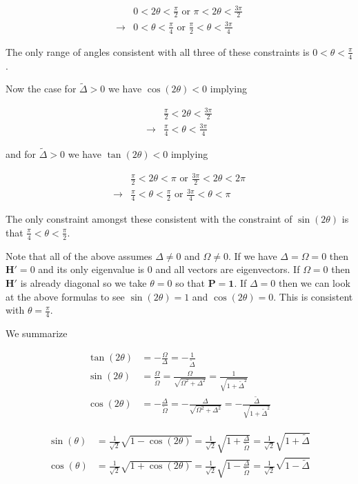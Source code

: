 \documentclass[12pt]{article}
\newcommand{\bv}[1]{\boldsymbol{#1}}
\begin{document}
\begin{align}
&0<2\theta <\frac{\pi}{2} \text{ or } \pi<2\theta<\frac{3\pi}{2}\\
\rightarrow &0<\theta<\frac{\pi}{4} \text{ or } \frac{\pi}{2}<\theta<\frac{3\pi}{4}
\end{align}

The only range of angles consistent with all three of these constraints is $0<\theta<\frac{\pi}{4}$.

Now the case for $\tilde{\Delta}>0$ we have $\cos(2\theta)<0$ implying

\begin{align}
&\frac{\pi}{2} < 2\theta < \frac{3\pi}{2}\\
\rightarrow &\frac{\pi}{4} < \theta < \frac{3\pi}{4}
\end{align}

and for $\tilde{\Delta}>0$ we have $\tan(2\theta) <0$ implying

\begin{align}
&\frac{\pi}{2}<2\theta<\pi \text{ or } \frac{3\pi}{2}<2\theta<2\pi\\
\rightarrow &\frac{\pi}{4}<\theta<\frac{\pi}{2} \text{ or } \frac{3\pi}{4}<\theta<\pi
\end{align}

The only constraint amongst these consistent with the constraint of $\sin(2\theta)$ is that $\frac{\pi}{4}<\theta<\frac{\pi}{2}$.

Note that all of the above assumes $\Delta \neq 0$ and $\Omega \neq 0$. If we have $\Delta = \Omega = 0$ then $\bv{H}'=0$ and its only eigenvalue is $0$ and all vectors are eigenvectors. If $\Omega =0$ then $\bv{H}'$ is already diagonal so we take $\theta=0$ so that $\bv{P} = \bv{1}$. If $\Delta =0$ then we can look at the above formulas to see $\sin(2\theta) = 1$ and $\cos(2\theta) = 0$. This is consistent with $\theta = \frac{\pi}{4}$.

We summarize

\begin{align}
\tan(2\theta) &= -\frac{\Omega}{\Delta} = -\frac{1}{\tilde{\Delta}}\\
\sin(2\theta) &= \frac{\Omega}{\tilde{\Omega}} = \frac{\Omega}{\sqrt{\Omega^2+\Delta^2}} = \frac{1}{\sqrt{1+\tilde{\Delta}^2}}\\
\cos(2\theta) &= -\frac{\Delta}{\tilde{\Omega}} = -\frac{\Delta}{\sqrt{\Omega^2+\Delta^2}} = -\frac{\tilde{\Delta}}{\sqrt{1+\tilde{\Delta}^2}}
\end{align}

\begin{align}
\sin(\theta) &= \frac{1}{\sqrt{2}} \sqrt{1-\cos(2\theta)} = \frac{1}{\sqrt{2}} \sqrt{1+\frac{\Delta}{\tilde{\Omega}}} = \frac{1}{\sqrt{2}}\sqrt{1+\tilde{\Delta}}\\
\cos(\theta) &= \frac{1}{\sqrt{2}} \sqrt{1+\cos(2\theta)} = \frac{1}{\sqrt{2}} \sqrt{1-\frac{\Delta}{\tilde{\Omega}}} = \frac{1}{\sqrt{2}}\sqrt{1-\tilde{\Delta}}\\
\end{align}
\end{document}
